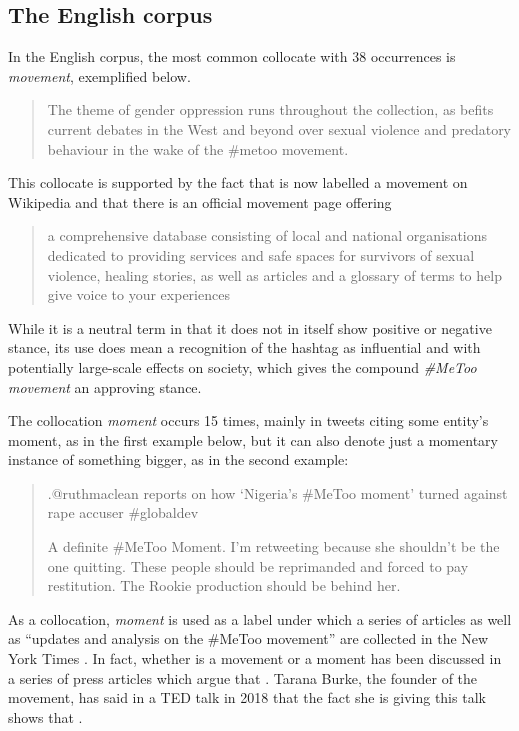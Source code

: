 \documentclass[output=paper,english,spanish,german,english]{langsci/langscibook}
\begin{document}
\subsection{The English corpus}

In the English corpus, the most common collocate with 38 occurrences is \textit{movement}, exemplified below.

\begin{quote}\sffamily
  The theme of gender oppression runs throughout the collection, as befits current debates in the West and beyond over sexual violence and predatory behaviour in the wake of the \#metoo movement.
\end{quote}

\noindent This collocate is supported by the fact that \mt is now labelled a movement on Wikipedia and that there is an official movement page offering \blockcquote{metoo}{a comprehensive database consisting of local and national organisations dedicated to providing services and safe spaces for survivors of sexual violence, healing stories, as well as articles and a glossary of terms to help give voice to your experiences}. While it is a neutral term in that it does not in itself show positive or negative stance, its use does mean a recognition of the hashtag as influential and with potentially large-scale effects on society, which gives the compound \textit{\#MeToo movement} an approving stance.

The collocation \textit{moment} occurs 15 times, mainly in tweets citing some entity's \mt moment, as in the first example below, but it can also denote just a momentary instance of something bigger, as in the second example:

\begin{quote}\sffamily
  .@ruthmaclean reports on how `Nigeria's \#MeToo moment' turned against rape accuser \#globaldev
  
  A definite \#MeToo Moment. I'm retweeting because she shouldn't be the one quitting. These people should be reprimanded and forced to pay restitution. The Rookie production should be behind her.
\end{quote}

\noindent As a collocation, \textit{\mt moment} is used as a label under which a series of articles as well as \enquote{updates and analysis on the \#MeToo movement} are collected in the New York Times \parencite{bennett19}. In fact, whether \mt is a movement or a moment has been discussed in a series of press articles \parencite{akhtar17} which argue that . Tarana Burke, the founder of the movement, has said in a TED talk in 2018 that the fact she is giving this talk shows that \mt {}.
\end{document}
